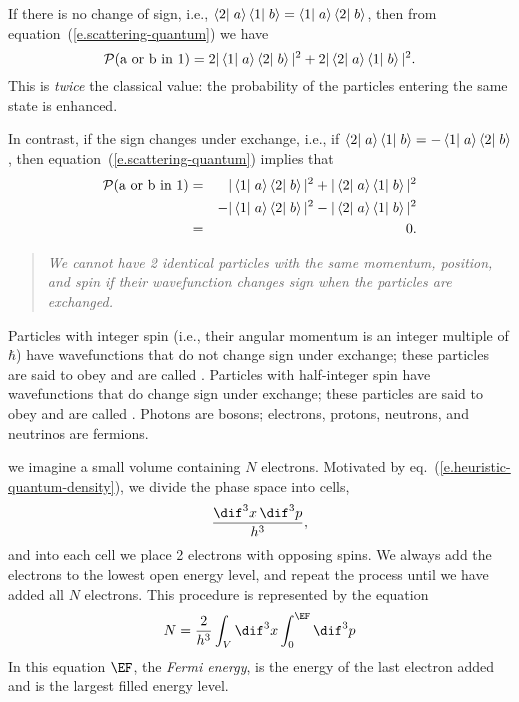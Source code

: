 \begin{sidebar}
If there is no change of sign, i.e., $\left\langle2\right|\left.a\right\rangle\left\langle1\right|\left.b\right\rangle = \left\langle1\right|\left.a\right\rangle\left\langle2\right|\left.b\right\rangle$, then from equation~(\ref{e.scattering-quantum}) we have
\begin{equation}\label{e.boson}
    \mathcal{P}(\textrm{a or b in 1}) = 2|\left\langle1\right|\left.a\right\rangle\left\langle2\right|\left.b\right\rangle|^2 + 2|\left\langle2\right|\left.a\right\rangle\left\langle1\right|\left.b\right\rangle|^2.
\end{equation}
This is \emph{twice} the classical value: the probability of the particles entering the same state is enhanced.

In contrast, if the sign changes under exchange, i.e., if $\left\langle2\right|\left.a\right\rangle\left\langle1\right|\left.b\right\rangle = -\left\langle1\right|\left.a\right\rangle\left\langle2\right|\left.b\right\rangle$, then equation~(\ref{e.scattering-quantum}) implies that
\begin{eqnarray}
\mathcal{P}(\textrm{a or b in 1}) &=& |\left\langle1\right|\left.a\right\rangle\left\langle2\right|\left.b\right\rangle|^{2} + |\left\langle2\right|\left.a\right\rangle\left\langle1\right|\left.b\right\rangle|^{2} \nonumber\\ 
    && - |\left\langle1\right|\left.a\right\rangle\left\langle2\right|\left.b\right\rangle|^{2} - |\left\langle2\right|\left.a\right\rangle\left\langle1\right|\left.b\right\rangle|^{2} \nonumber\\ 
    &=& 0.\label{e.fermion}
\end{eqnarray}
\begin{quote}\itshape
We cannot have 2 identical particles with the same momentum, position, and spin if their wavefunction changes sign when the particles are exchanged.
\end{quote}
Particles with integer spin (i.e., their angular momentum is an integer multiple of $\hbar$) have wavefunctions that do not change sign under exchange; these particles are said to obey  and are called .  Particles with half-integer spin have wavefunctions that do change sign under exchange; these particles are said to obey  and are called .  Photons are bosons; electrons, protons, neutrons, and neutrinos are fermions.
\end{sidebar}

 we imagine a small volume containing $N$ electrons. Motivated by eq.~(\ref{e.heuristic-quantum-density}), we divide the phase space into cells,
\[
	\frac{\dif^{3}x\,\dif^{3}p}{h^{3}},
\]
and into each cell we place 2 electrons with opposing spins. We always add the electrons to the lowest open energy level, and repeat the process until we have added all $N$ electrons. This procedure is represented by the equation
\begin{equation}
\label{e.number-degenerate}
	N = \frac{2}{h^{3}}\int_{V}\dif^{3}x\int_{0}^{\EF}\dif^{3}p
\end{equation}
In this equation $\EF$, the \emph{Fermi energy}, is the energy of the last electron added and is the largest filled energy level.


